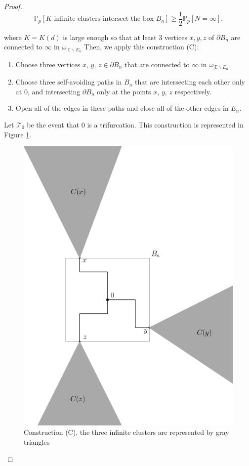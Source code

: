 \documentclass[a4paper,11pt]{article}
\theoremstyle{plain}
\theoremstyle{definition}
\theoremstyle{remark}
\begin{document}
\begin{proof}
\[ \mathbb{P}_p[\text{$K$ infinite clusters intersect the box } B_n] \geq \frac{1}{2}\mathbb{P}_p[N = \infty].\]

where $K = K(d)$ is large enough so that at least $3$ vertices $x, y, z$ of $\partial B_n$ are connected to $\infty$ in $\omega_{|\mathbb{E} \backslash E_n}$
Then, we apply this construction (C):
\begin{enumerate}
    \item Choose three vertices $x$, $y$, $z \in \partial B_n$ that are connected to $\infty$ in $\omega_{|\mathbb{E}\backslash E_n}$.
    \item Choose three self-avoiding paths in $B_n$ that are intersecting each other only at $0$, and intersecting $\partial B_n$ only at the points $x$, $y$, $z$ respectively.
    \item Open all of the edges in these paths and close all of the other edges in $E_n$.
\end{enumerate}
Let $\mathscr{T}_0$ be the event that $0$ is a trifurcation. This construction is represented in Figure \ref{fig:trif_construct}.

\begin{figure}
    \centering
    \includegraphics[scale=0.35]{trifconstr.png}
    \caption{Construction (C), the three infinite clusters are represented by gray triangles}
    \label{fig:trif_construct}
\end{figure}


\end{proof}
\end{document}
